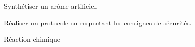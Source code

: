 \sndEnTeteSix

\vspace*{-40pt}

\begin{objectifs}
  \item Synthétiser un arôme artificiel.
  \item Réaliser un protocole en respectant les consignes de sécurités.
\end{objectifs}

\begin{contexte}
  
  \problematique{
  }
\end{contexte}


\begin{doc}{Réaction chimique}
  \vspace*{-22pt}
  \begin{encart}

  \end{encart}

\end{doc}


